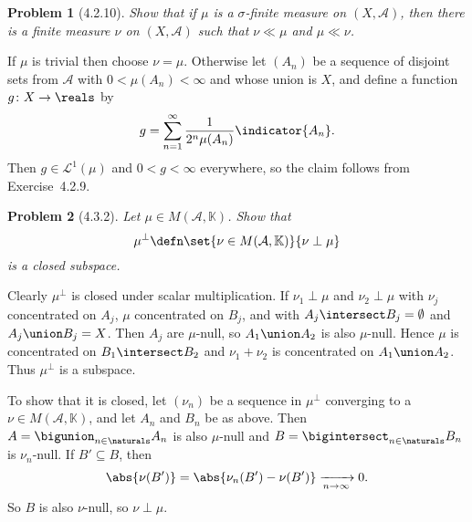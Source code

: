 \documentclass[a4paper, 11pt]{memoir}
\theoremstyle{plaincustomnumber}
\newtheorem{problem}{Problem}
\theoremstyle{changedotbreakcustomnumber}
\newcommand{\calL}{\mathcal{L}}
\newcommand{\calA}{\mathcal{A}}
\newcommand{\fieldK}{\mathbb{K}}
\begin{document}
\begin{problem}[4.2.10]
    Show that if $\mu$ is a $\sigma$-finite measure on $(X,\calA)$, then there is a finite measure $\nu$ on $(X,\calA)$ such that $\nu \ll \mu$ and $\mu \ll \nu$.
\end{problem}

\begin{solution}
    If $\mu$ is trivial then choose $\nu = \mu$. Otherwise let $(A_n)$ be a sequence of disjoint sets from $\calA$ with $0 < \mu(A_n) < \infty$ and whose union is $X$, and define a function $g \colon X \to \reals$ by
    \begin{equation*}
        g
            = \sum_{n=1}^\infty \frac{1}{2^n \mu(A_n)} \indicator{A_n}.
    \end{equation*}
    Then $g \in \calL^1(\mu)$ and $0 < g < \infty$ everywhere, so the claim follows from Exercise~4.2.9.
\end{solution}


\begin{problem}[4.3.2]
    Let $\mu \in M(\calA,\fieldK)$. Show that
    \begin{equation*}
        \mu^\perp
            \defn \set{\nu \in M(\calA,\fieldK)}{\nu \perp \mu}
    \end{equation*}
    is a closed subspace.
\end{problem}

\begin{solution}
    Clearly $\mu^\perp$ is closed under scalar multiplication. If $\nu_1 \perp \mu$ and $\nu_2 \perp \mu$ with $\nu_j$ concentrated on $A_j$, $\mu$ concentrated on $B_j$, and with $A_j \intersect B_j = \emptyset$ and $A_j \union B_j = X$. Then $A_j$ are $\mu$-null, so $A_1 \union A_2$ is also $\mu$-null. Hence $\mu$ is concentrated on $B_1 \intersect B_2$ and $\nu_1 + \nu_2$ is concentrated on $A_1 \union A_2$. Thus $\mu^\perp$ is a subspace.

    To show that it is closed, let $(\nu_n)$ be a sequence in $\mu^\perp$ converging to a $\nu \in M(\calA,\fieldK)$, and let $A_n$ and $B_n$ be as above. Then $A = \bigunion_{n \in \naturals} A_n$ is also $\mu$-null and $B = \bigintersect_{n \in \naturals} B_n$ is $\nu_n$-null. If $B' \subseteq B$, then
    \begin{equation*}
        \abs{\nu(B')}
            = \abs{\nu_n(B') - \nu(B')}
            \xrightarrow[n \to \infty]{} 0.
    \end{equation*}
    So $B$ is also $\nu$-null, so $\nu \perp \mu$.
\end{solution}
\end{document}
